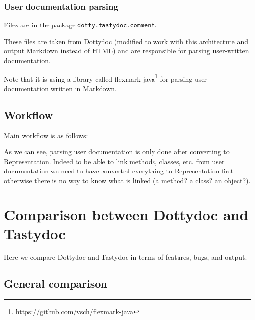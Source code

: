 \documentclass{report}
\begin{document}
\subsection{User documentation parsing}
Files are in the package \texttt{dotty.tastydoc.comment}.

These files are taken from Dottydoc (modified to work with this architecture and output Markdown instead of HTML) and are responsible for parsing user-written documentation.

Note that it is using a library called flexmark-java\footnote{\url{https://github.com/vsch/flexmark-java}} for parsing user documentation written in Markdown.

\section{Workflow}
\label{sec:workflow}
Main workflow is as follows:

\begin{center}
\end{center}

As we can see, parsing user documentation is only done after converting to Representation. Indeed to be able to link methods, classes, etc. from user documentation we need to have converted everything to Representation first otherwise there is no way to know what is linked (a method? a class? an object?).


\chapter{Comparison between Dottydoc and Tastydoc}
Here we compare Dottydoc and Tastydoc in terms of features, bugs, and output.

\section{General comparison}
\label{sec:comparison}
\end{document}
